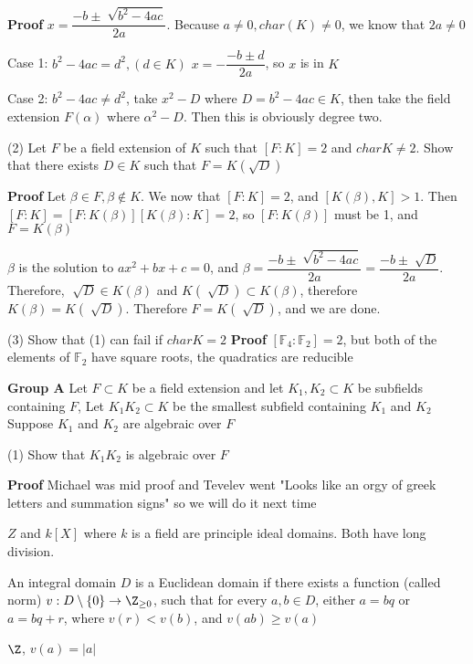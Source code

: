 \documentclass[10pt]{article}
\newcommand{\F}{\mathbb{F}}
\begin{document}
\textbf{Proof} $x = \dfrac{- b \pm \sqrt[]{b^2 - 4ac}}{2a}$. Because $a\neq 0, char(K) \neq 0$, we know that $2a \neq 0$

Case 1: $b^2 - 4ac = d^2, (d \in K)$ $x = - \dfrac{- b \pm d}{2a}$, so $x$ is in $K$

Case 2: $b^2 - 4ac \neq d^2$, take $x^2 - D$ where $D = b^2 - 4ac \in K$, then take the field extension $F(\alpha)$ where $\alpha^2 - D$. Then this is obviously degree two.

(2) Let $F$ be a field extension of $K$ such that $[F: K] = 2$ and $charK \neq 2$. Show that there exists $D \in K$ such that $F = K(\sqrt{D})$

\textbf{Proof} Let $\beta \in F, \beta \not \in K$. We now that $[F : K] = 2$, and $[K(\beta), K] > 1$. Then $[F: K] = [F : K(\beta)][K(\beta): K] = 2$, so $[F : K(\beta)]$ must be 1, and $F = K(\beta)$

$\beta$ is the solution to $ax^2 + bx + c = 0$, and $\beta = \dfrac{-b \pm \sqrt[]{b^2 - 4ac}}{2a} = \dfrac{-b \pm \sqrt[]{D}}{2a}$. Therefore, $\sqrt[]{D} \in K(\beta)$ and $K(\sqrt[]{D}) \subset K(\beta)$, therefore $K(\beta) = K(\sqrt[]{D})$. Therefore $F = K(\sqrt[]{D})$, and we are done.

(3) Show that (1) can fail if $charK = 2$
\textbf{Proof} $[\F_4 : \F_2] = 2$, but both of the elements of $\F_2$ have square roots, the quadratics are reducible

\textbf{Group A}
Let $F \subset K$ be a field extension and let $K_1, K_2 \subset K$ be subfields containing $F$, Let $K_1K_2 \subset K$ be the smallest subfield containing $K_1$ and $K_2$ Suppose $K_1$ and $K_2$ are algebraic over $F$

(1) Show that $K_1K_2$ is algebraic over $F$

\textbf{Proof}
Michael was mid proof and Tevelev went "Looks like an orgy of greek letters and summation signs" so we will do it next time

$Z$ and $k[X]$ where $k$ is a field are principle ideal domains. Both have long division. 

\begin{defn}
    An integral domain $D$ is a Euclidean domain if there exists a function (called norm) $v: D\setminus\{0\} \to \Z_{\geq 0}$, such that for every $a, b \in D$, either $a = bq$ or $a = bq + r$, where $v(r) < v(b)$, and $v(ab) \geq v(a)$
\end{defn}

\begin{exm*}
    $\Z$, $v(a) = |a|$
\end{exm*}
\end{document}
